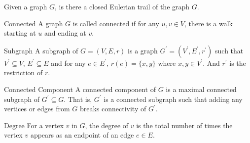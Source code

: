 \documentclass{report}
\begin{document}
Given a graph $G$, is there a closed Eulerian trail of the graph $G$.

\begin{definition}{Connected}
    A graph $G$ is called connected if for any $u, v \in V$, there is a walk starting at $u$ and ending at $v$.
\end{definition}

\begin{definition}{Subgraph}
    A subgraph of $G = (V, E, r)$ is a graph $G^{\prime} = (V^{\prime}, E^{\prime}, r^{\prime})$ such that $V^{\prime} \subseteq V$, $E^{\prime} \subseteq E$ and for any $e \in E^{\prime}$, $r(e) = \{x, y\}$ where $x, y \in V^{\prime}$. And $r^{\prime}$ is the restriction of $r$.
\end{definition}

\begin{definition}{Connected Component}
    A connected component of $G$ is a maximal connected subgraph of $G^{\prime} \subseteq G$. That is, $G^{\prime}$ is a connected subgraph such that adding any vertices or edges from $G$ breaks connectivity of $G^{\prime}$.
\end{definition}

\begin{definition}{Degree}
    For a vertex $v$ in $G$, the degree of $v$ is the total number of times the vertex $v$ appears as an endpoint of an edge $e \in E$.
\end{definition}
\end{document}
